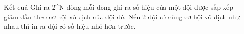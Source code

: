 Kết quả
Ghi ra 2^N dòng mỗi dòng ghi ra số hiệu của một đội được sắp xếp giảm dần theo cơ hội vô địch của đội đó. Nếu 2 đội có cùng cơ hội vô địch như nhau thì in ra đội có số hiệu nhỏ hơn trước.